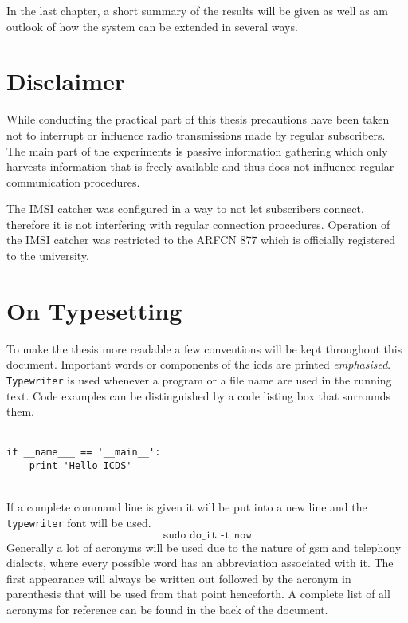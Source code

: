 In the last chapter, a short summary of the results will be given as well as am outlook of how the system can be extended in several ways.

\section{Disclaimer}
While conducting the practical part of this thesis precautions have been taken not to interrupt or influence radio transmissions made by regular subscribers.
The main part of the experiments is passive information gathering which only harvests information that is freely available and thus does not influence regular communication procedures.

The IMSI catcher was configured in a way to not let subscribers connect, therefore it is not interfering with regular connection procedures.
Operation of the IMSI catcher was restricted to the ARFCN 877 which is officially registered to the university.

\section{On Typesetting}
To make the thesis more readable a few conventions will be kept throughout this document.
Important words or components of the \gls{icds} are printed \emph{emphasised}.
\texttt{Typewriter} is used whenever a program or a file name are used in the running text.
Code examples can be distinguished by a code listing box that surrounds them.\\\\
\hspace*{\dimexpr\fboxsep+\fboxrule}%
\begin{minipage}{\dimexpr\textwidth-4\fboxsep-2\fboxrule} 
\begin{lstlisting} 
if __name___ == '__main__':
    print 'Hello ICDS'
\end{lstlisting} 
\end{minipage}\\
If a complete command line is given it will be put into a new line and the \texttt{typewriter} font will be used.
\[\texttt{sudo do\_it -t now}\]
Generally a lot of acronyms will be used due to the nature of \gls{gsm} and telephony dialects, where every possible word has an abbreviation associated with it.
The first appearance will always be written out followed by the acronym in parenthesis that will be used from that point henceforth.
A complete list of all acronyms for reference can be found in the back of the document.